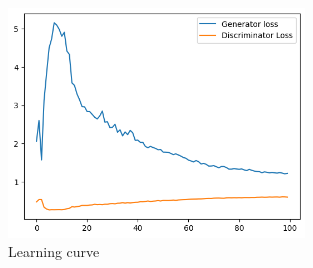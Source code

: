 \documentclass[a4paper]{article}
\theoremstyle{definition}
\newenvironment{soln}{
	\leavevmode\color{blue}\ignorespaces
}{}
\begin{document}
\begin{enumerate} [label=(\alph*)]
\begin{soln}
            \begin{figure}[H]
			\centering
			\includegraphics[width=0.7\textwidth]{loss_q3.png}
			\caption{Learning curve}
			\label{fig:5}
		\end{figure}
		

\end{soln}
\end{enumerate}
\end{document}
